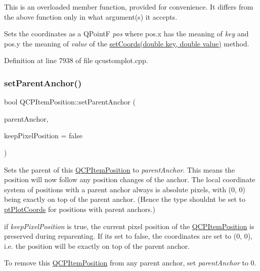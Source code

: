 This is an overloaded member function, provided for convenience. It differs from the above function only in what argument(s) it accepts.

Sets the coordinates as a Q\+PointF {\itshape pos} where pos.\+x has the meaning of {\itshape key} and pos.\+y the meaning of {\itshape value} of the \hyperlink{class_q_c_p_item_position_aa988ba4e87ab684c9021017dcaba945f}{set\+Coords(double key, double value)} method. 

Definition at line 7938 of file qcustomplot.\+cpp.

\mbox{\label{class_q_c_p_item_position_ac094d67a95d2dceafa0d50b9db3a7e51}} 
\subsubsection{\texorpdfstring{set\+Parent\+Anchor()}{setParentAnchor()}}
{\footnotesize\ttfamily bool Q\+C\+P\+Item\+Position\+::set\+Parent\+Anchor (\begin{DoxyParamCaption}\item[{\hyperlink{class_q_c_p_item_anchor}{Q\+C\+P\+Item\+Anchor} $\ast$}]{parent\+Anchor,  }\item[{bool}]{keep\+Pixel\+Position = {\ttfamily false} }\end{DoxyParamCaption})}

Sets the parent of this \hyperlink{class_q_c_p_item_position}{Q\+C\+P\+Item\+Position} to {\itshape parent\+Anchor}. This means the position will now follow any position changes of the anchor. The local coordinate system of positions with a parent anchor always is absolute pixels, with (0, 0) being exactly on top of the parent anchor. (Hence the type shouldn\textquotesingle{}t be set to \hyperlink{class_q_c_p_item_position_aad9936c22bf43e3d358552f6e86dbdc8ad5ffb8dc99ad73263f7010c77342294c}{pt\+Plot\+Coords} for positions with parent anchors.)

if {\itshape keep\+Pixel\+Position} is true, the current pixel position of the \hyperlink{class_q_c_p_item_position}{Q\+C\+P\+Item\+Position} is preserved during reparenting. If it\textquotesingle{}s set to false, the coordinates are set to (0, 0), i.\+e. the position will be exactly on top of the parent anchor.

To remove this \hyperlink{class_q_c_p_item_position}{Q\+C\+P\+Item\+Position} from any parent anchor, set {\itshape parent\+Anchor} to 0.


